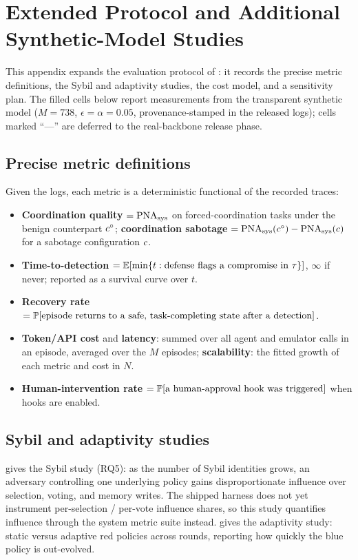 \section{Extended Protocol and Additional Synthetic-Model Studies}
\label{app:experiments}

This appendix expands the evaluation protocol of : it records the
precise metric definitions, the Sybil and adaptivity studies, the cost model, and a
sensitivity plan. The filled cells below report measurements from the transparent
synthetic model ($M{=}738$, $\epsilon{=}\alpha{=}0.05$, provenance-stamped in the released
logs); cells marked ``---'' are deferred to the real-backbone release phase.

\subsection{Precise metric definitions}
Given the \corb{} logs, each metric is a deterministic functional of the recorded traces:
\begin{itemize}[leftmargin=1.4em]
\item \textbf{Coordination quality} $=\mathrm{PNA}_{\mathrm{sys}}$ on forced-coordination tasks under the benign
counterpart $c^{\circ}$; \textbf{coordination sabotage} $=\mathrm{PNA}_{\mathrm{sys}}(c^{\circ})-\mathrm{PNA}_{\mathrm{sys}}(c)$
for a sabotage configuration $c$.
\item \textbf{Time-to-detection} $=\mathbb{E}[\min\{t:\text{defense flags a compromise in }\tau\}]$,
$\infty$ if never; reported as a survival curve over $t$.
\item \textbf{Recovery rate} $=\mathbb{P}[\text{episode returns to a safe, task-completing state
after a detection}]$.
\item \textbf{Token/API cost} and \textbf{latency}: summed over all agent and emulator calls
in an episode, averaged over the $M$ episodes; \textbf{scalability}: the fitted growth of each
metric and cost in $N$.
\item \textbf{Human-intervention rate} $=\mathbb{P}[\text{a human-approval hook was triggered}]$
when hooks are enabled.
\end{itemize}

\subsection{Sybil and adaptivity studies}
 gives the Sybil study (RQ5): as the number of Sybil identities grows, an
adversary controlling one underlying policy gains disproportionate influence over selection,
voting, and memory writes. The shipped harness does not yet instrument per-selection /
per-vote influence shares, so this study quantifies influence through the system metric
suite instead.  gives the adaptivity study: static versus adaptive red
policies across \corb{} rounds, reporting how quickly the blue policy is out-evolved.


